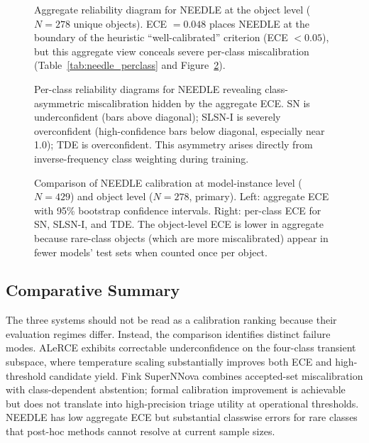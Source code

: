 \documentclass[twocolumn]{aastex631}
\begin{document}
\begin{figure}
\caption{Aggregate reliability diagram for NEEDLE at the object level ($N = 278$ unique objects). ECE $= 0.048$ places NEEDLE at the boundary of the heuristic ``well-calibrated'' criterion (ECE $< 0.05$), but this aggregate view conceals severe per-class miscalibration (Table~\ref{tab:needle_perclass} and Figure~\ref{fig:needle_perclass}). \label{fig:needle_aggregate}}
\end{figure}

\begin{figure}
\caption{Per-class reliability diagrams for NEEDLE revealing class-asymmetric miscalibration hidden by the aggregate ECE. SN is underconfident (bars above diagonal); SLSN-I is severely overconfident (high-confidence bars below diagonal, especially near 1.0); TDE is overconfident. This asymmetry arises directly from inverse-frequency class weighting during training. \label{fig:needle_perclass}}
\end{figure}

\begin{figure}
\caption{Comparison of NEEDLE calibration at model-instance level ($N = 429$) and object level ($N = 278$, primary). Left: aggregate ECE with 95\% bootstrap confidence intervals. Right: per-class ECE for SN, SLSN-I, and TDE. The object-level ECE is lower in aggregate because rare-class objects (which are more miscalibrated) appear in fewer models' test sets when counted once per object. \label{fig:needle_comparison}}
\end{figure}

\subsection{Comparative Summary}\label{sec:comparative}

The three systems should not be read as a calibration ranking
because their evaluation regimes differ. Instead, the comparison
identifies distinct failure modes. ALeRCE exhibits correctable
underconfidence on the four-class transient subspace, where
temperature scaling substantially improves both ECE and
high-threshold candidate yield. Fink SuperNNova combines
accepted-set miscalibration with class-dependent abstention;
formal calibration improvement is achievable but does not
translate into high-precision triage utility at operational
thresholds. NEEDLE has low aggregate ECE but substantial
classwise errors for rare classes that post-hoc methods cannot
resolve at current sample sizes.
\end{document}
